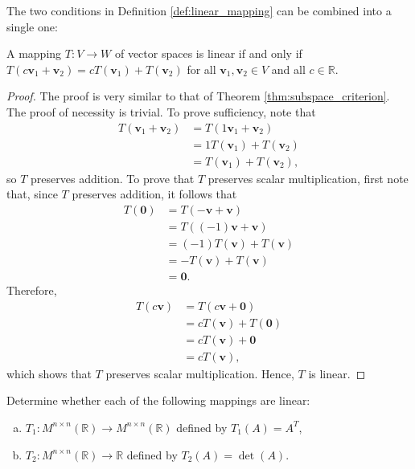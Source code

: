 \documentclass[12pt,letterpaper,reqno]{article}
\numberwithin{equation}{section}
\begin{document}
The two conditions in Definition \ref{def:linear_mapping} can be combined into a single one:

\begin{prop}\label{prop:test_for_linearity}
A mapping $T:V \to W$ of vector spaces is linear if and only if $T(c\mathbf{v}_1+\mathbf{v}_2)=cT(\mathbf{v}_1)+T(\mathbf{v}_2)$ for all $\mathbf{v}_1,\mathbf{v}_2 \in V$ and all $c \in \mathbb{R}$.
\end{prop}

\begin{proof}
	The proof is very similar to that of Theorem \ref{thm:subspace_criterion}. The proof of necessity is trivial. To prove sufficiency, note that 
	\begin{align*}
		T(\mathbf{v}_1+\mathbf{v}_2)&=T(1\mathbf{v}_1+\mathbf{v}_2)\\
		&=1T(\mathbf{v}_1)+T(\mathbf{v}_2) \\
		&=T(\mathbf{v}_1)+T(\mathbf{v}_2),
	\end{align*}
	so $T$ preserves addition. To prove that $T$ preserves scalar multiplication, first note that, since $T$ preserves addition, it follows that 
	\begin{align*}
		T(\mathbf{0})&=T(-\mathbf{v}+\mathbf{v}) \\
		&=T((-1)\mathbf{v}+\mathbf{v}) \\
		&=(-1)T(\mathbf{v})+T(\mathbf{v}) \\
		&=-T(\mathbf{v})+T(\mathbf{v}) \\
		&=\mathbf{0}.
	\end{align*}
	Therefore,
	\begin{align*}
		T(c\mathbf{v})&=T(c\mathbf{v}+\mathbf{0}) \\
		&=cT(\mathbf{v})+T(\mathbf{0}) \\
		&=cT(\mathbf{v})+\mathbf{0} \\
		&=cT(\mathbf{v}),
	\end{align*}
	which shows that $T$ preserves scalar multiplication. Hence, $T$ is linear.
\end{proof}

\begin{exercise}
Determine whether each of the following mappings are linear:
\begin{enumerate}[(a)]
	\item $T_1:M^{n \times n}(\mathbb{R}) \to M^{n \times n}(\mathbb{R})$ defined by $T_1(A)=A^{T}$,
	\item $T_2:M^{n \times n}(\mathbb{R}) \to \mathbb{R}$ defined by $T_2(A)=\det(A)$.
\end{enumerate}	
\end{exercise}
\end{document}
